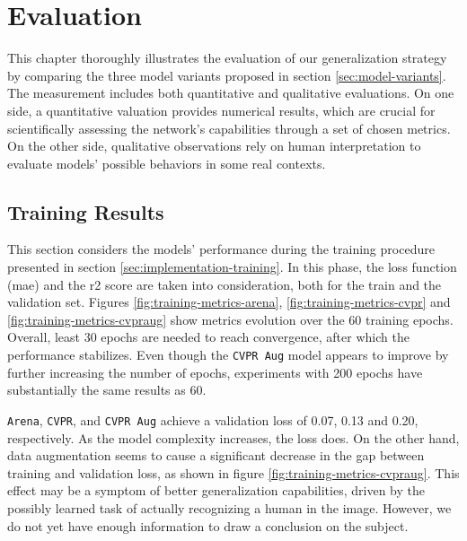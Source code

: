 \chapter{Evaluation}
\label{chap:evaluation}


This chapter thoroughly illustrates the evaluation of our generalization strategy by comparing the three model variants proposed in section \ref{sec:model-variants}. The measurement includes both quantitative and qualitative evaluations. On one side, a quantitative valuation provides numerical results, which are crucial for scientifically assessing the network's capabilities through a set of chosen metrics. On the other side, qualitative observations rely on human interpretation to evaluate models' possible behaviors in some real contexts.



\section{Training Results}
\label{sec:evaluation-training}

This section considers the models' performance during the training procedure presented in section \ref{sec:implementation-training}. In this phase, the loss function (\gls{mae}) and the \gls{r2} score are taken into consideration, both for the train and the validation set. Figures \ref{fig:training-metrics-arena}, \ref{fig:training-metrics-cvpr} and \ref{fig:training-metrics-cvpraug} show metrics evolution over the 60 training epochs. Overall, least 30 epochs are needed to reach convergence, after which the performance stabilizes. Even though the \texttt{CVPR Aug} model appears to improve by further increasing the number of epochs, experiments with 200 epochs have substantially the same results as 60.

\texttt{Arena}, \texttt{CVPR}, and \texttt{CVPR Aug} achieve a validation loss of 0.07, 0.13 and 0.20, respectively. As the model complexity increases, the loss does. On the other hand, data augmentation seems to cause a significant decrease in the gap between training and validation loss, as shown in figure \ref{fig:training-metrics-cvpraug}. This effect may be a symptom of better generalization capabilities, driven by the possibly learned task of actually recognizing a human in the image. However, we do not yet have enough information to draw a conclusion on the subject.

